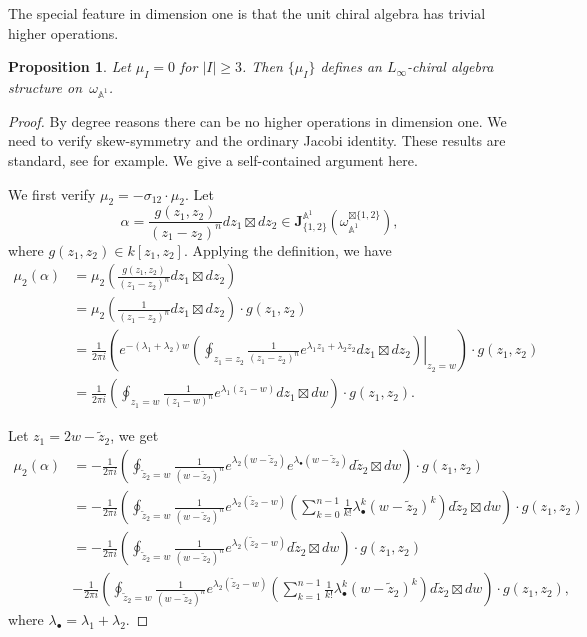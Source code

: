 \documentclass[11pt]{amsart}
\newtheorem{prop}[thm]{Proposition}
\theoremstyle{definition}
\theoremstyle{remark}
\numberwithin{equation}{section}
\begin{document}
The special feature in dimension one is that the unit chiral algebra has trivial higher operations.

\begin{prop}
Let $\mu_{ I}=0$ for $| I|\geq3$. Then $\{\mu_{ I}\}$ defines an $L_{\infty}$-chiral algebra structure on~$\omega_{\mathbb{A}^{1}}$.
\end{prop}
\begin{proof}
  By degree reasons there can be no higher operations in dimension one.
  We need to verify skew-symmetry and the ordinary Jacobi identity.
  These results are standard, see \cite{YiZhiHuang?} for example. 
  We give a self-contained argument here.

  We first verify $\mu_{2}=-\sigma_{12} \cdot \mu_{2}$.   
    Let 
$$\alpha=\frac{g(z_{1},z_{2})}{(z_{1}-z_{2})^{n}}dz_{1}\boxtimes dz_{2}\in \mathbf{J}^{\mathbb{A}^1}_{\{1,2\}}(\omega_{\mathbb{A}^1}^{\boxtimes\{1,2\}}),
$$
where $g(z_{1},z_{2})\in k[z_{1},z_{2}]$. 
Applying the definition, we have
\begin{align*}
  \mu_{2}(\alpha)
    &=
    \mu_{2}(\frac{g(z_{1},z_{2})}{(z_{1}-z_{2})^{n}}dz_{1}\boxtimes dz_{2})\\
    &=
    \mu_{2}(\frac{1}{(z_{1}-z_{2})^{n}}dz_{1}\boxtimes dz_{2})\cdot g(z_{1},z_{2})\\
    &=
    \frac{1}{2\pi i}\left(e^{-(\lambda_{1}+\lambda_{2})w}\left. \left(\oint_{z_{1}=z_2}\frac{1}{(z_{1}-z_{2})^{n}}e^{\lambda_{1}z_{1}+\lambda_{2}z_{2}}dz_{1}\boxtimes dz_{2}\right)\right|_{z_{2}=w}\right)\cdot g(z_{1},z_{2})\\
    &=
     \frac{1}{2\pi i}\left(\oint_{z_{1}=w}\frac{1}{(z_{1}-w)^{n}}e^{\lambda_{1}(z_{1}-w)}dz_{1}\boxtimes dw\right)\cdot g(z_{1},z_{2}).
\end{align*}

Let $z_{1}=2w-\tilde{z}_2$, we get
\begin{align*}
  \mu_{2}(\alpha)
    &=
    -\frac{1}{2\pi i}\left(\oint_{\tilde{z}_{2}=w}\frac{1}{(w-\tilde{z}_{2})^{n}}e^{\lambda_{2}(w-\tilde{z}_{2})}e^{\lambda_{\bullet}(w-\tilde{z}_{2})}d\tilde{z}_{2}\boxtimes dw\right)\cdot g(z_{1},z_{2})\\
    &=
     -\frac{1}{2\pi i}\left(\oint_{\tilde{z}_{2}=w}\frac{1}{(w-\tilde{z}_{2})^{n}}e^{\lambda_{2}(\tilde{z}_{2}-w)}\left(\sum_{k=0}^{n-1}\frac{1}{k!}\lambda_{\bullet}^{k}(w-\tilde{z}_{2})^{k} \right)d\tilde{z}_{2}\boxtimes dw\right)\cdot g(z_{1},z_{2})\\
     &=
      -\frac{1}{2\pi i}\left(\oint_{\tilde{z}_{2}=w}\frac{1}{(w-\tilde{z}_{2})^{n}}e^{\lambda_{2}(\tilde{z}_{2}-w)}d\tilde{z}_{2}\boxtimes dw\right)\cdot g(z_{1},z_{2})\\
      &-
     \frac{1}{2\pi i}\left(\oint_{\tilde{z}_{2}=w}\frac{1}{(w-\tilde{z}_{2})^{n}}e^{\lambda_{2}(\tilde{z}_{2}-w)}\left(\sum_{k=1}^{n-1}\frac{1}{k!}\lambda_{\bullet}^{k}(w-\tilde{z}_{2})^{k} \right)d\tilde{z}_{2}\boxtimes dw\right)\cdot g(z_{1},z_{2}),
\end{align*}
where $\lambda_{\bullet}=\lambda_{1}+\lambda_{2}$.


\end{proof}
\end{document}
